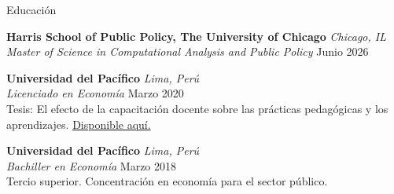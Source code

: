 \documentclass{resume} %
\begin{document}

\begin{rSection}{Educación}

{\bf Harris School of Public Policy, The University of Chicago} \hfill \textit{Chicago, IL} \\
\textit{Master of Science in Computational Analysis and Public Policy} \hfill {Junio 2026}

{\bf Universidad del Pacífico} \hfill \textit{Lima, Perú} \\
\textit{Licenciado en Economía} \hfill {Marzo 2020} \\
Tesis: El efecto de la capacitación docente sobre las prácticas pedagógicas y los aprendizajes. \href{https://repositorio.up.edu.pe/handle/11354/2653}{Disponible aquí.}

{\bf Universidad del Pacífico} \hfill \textit{Lima, Perú} \\
\textit{Bachiller en Economía} \hfill {Marzo 2018} \\
Tercio superior. Concentración en economía para el sector público.

\end{rSection}
\end{document}
